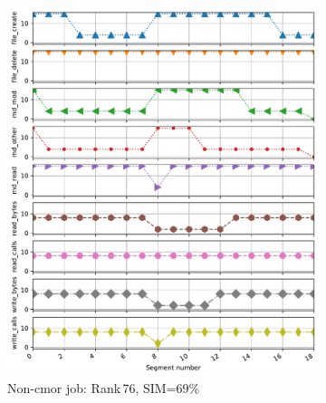 \documentclass{jhps}
\begin{document}
\begin{figure}[bt]
\centering
\begin{subfigure}{0.3\textwidth}
\centering
\includegraphics[width=\textwidth]{job_similarities_4296426-out/bin_aggzeros-0.6923--76timeseries4235560}
\caption{Non-cmor job: Rank\,76, SIM=69\%}
\end{subfigure}
\qquad
\begin{subfigure}{0.3\textwidth}
\centering

\end{subfigure}
\end{figure}
\end{document}
